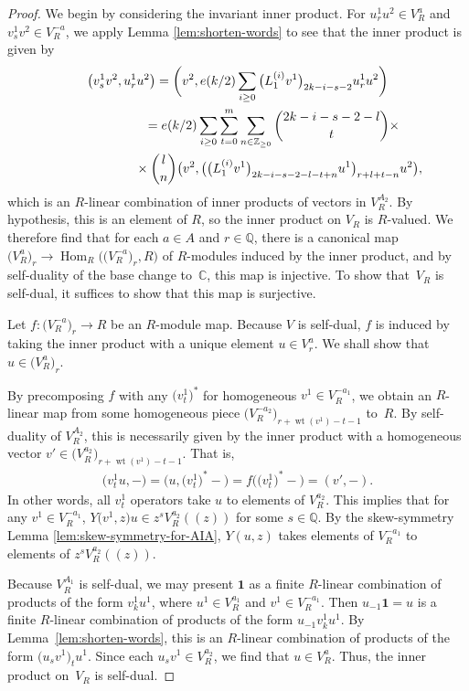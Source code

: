 \documentclass[pdftex]{sigma}
\newcommand{\bC}{\mathbb{C}}
\newcommand{\bQ}{\mathbb{Q}}
\newcommand{\bZ}{\mathbb{Z}}
\newcommand{\unit}{\mathbf{1}}
\DeclareMathOperator{\Hom}{Hom}
\DeclareMathOperator{\wt}{wt}
\theoremstyle{definition}
\begin{document}
\begin{proof}
We begin by considering the invariant inner product. For $u^1_r u^2 \in V^a_R$ and $v^1_s v^2 \in V^{-a}_R$, we apply Lemma \ref{lem:shorten-words} to see that the inner product is given by
\begin{gather*}
\big(v^1_s v^2, u^1_r u^2\big) = \bigg(v^2, e(k/2) \sum_{i \geq 0} \big(L_1^{(i)} v^1\big)_{2k-i-s-2} u^1_r u^2\bigg) \\
\hphantom{\big(v^1_s v^2, u^1_r u^2\big)}{} = e(k/2) \sum_{i \geq 0} \sum_{t=0}^m \sum_{n \in \bZ_{\geq 0}} \binom{2k-i-s-2-l}{t} \times \\
\hphantom{\big(v^1_s v^2, u^1_r u^2\big)=}{} \times \binom{l}{n} \big(v^2, \big(\big(L_1^{(i)} v^1\big)_{2k-i-s-2-l-t+n}u^1\big)_{r+l+t-n} u^2\big),
\end{gather*}
which is an $R$-linear combination of inner products of vectors in $V^{A_2}_R$. By hypothesis, this is an element of $R$, so the inner product on $V_R$ is $R$-valued. We therefore find that for each $a \in A$ and $r \in \bQ$, there is a canonical map $\big(V^a_R\big)_r \to \Hom_R\big(\big(V^{-a}_R\big)_r, R\big)$ of $R$-modules induced by the inner product, and by self-duality of the base change to~$\bC$, this map is injective. To show that~$V_R$ is self-dual, it suffices to show that this map is surjective.

Let $f\colon \big(V^{-a}_R\big)_r \to R$ be an $R$-module map. Because $V$ is self-dual, $f$ is induced by taking the inner product with a unique element $u \in V^a_r$. We shall show that $u \in \big(V^a_R\big)_r$.

By precomposing $f$ with any $\big(v^1_t\big)^*$ for homogeneous $v^1 \in V^{-a_1}_R$, we obtain an $R$-linear map from some homogeneous piece $\big(V^{-a_2}_R\big)_{r+\wt(v^1)-t-1}$ to~$R$. By self-duality of $V^{A_2}_R$, this is necessarily given by the inner product with a homogeneous vector $v' \in \big(V^{a_2}_R\big)_{r+\wt(v^1)-t-1}$. That is,
\begin{gather*} \big(v^1_t u, -\big) = \big(u, \big(v^1_t\big)^* -\big) = f\big(\big(v^1_t\big)^* -\big) = (v',-). \end{gather*}
In other words, all $v^1_t$ operators take $u$ to elements of $V^{a_2}_R$. This implies that for any $v^1 \in V^{-a_1}_R$, $Y\big(v^1,z\big)u \in z^s V^{a_2}_R((z))$ for some $s \in \bQ$. By the skew-symmetry Lemma \ref{lem:skew-symmetry-for-AIA}, $Y(u,z)$ takes elements of $V^{-a_1}_R$ to elements of $z^sV^{a_2}_R((z))$.

Because $V^{A_1}_R$ is self-dual, we may present $\unit$ as a finite $R$-linear combination of products of the form $v^1_k u^1$, where $u^1 \in V^{a_1}_R$ and $v^1 \in V^{-a_1}_R$. Then $u_{-1} \unit = u$ is a finite $R$-linear combination of products of the form $u_{-1} v^1_k u^1$. By Lemma~\ref{lem:shorten-words}, this is an $R$-linear combination of products of the form $\big(u_s v^1\big)_t u^1$. Since each $u_s v^1 \in V^{a_2}_R$, we find that $u \in V^a_R$. Thus, the inner product on~$V_R$ is self-dual.


\end{proof}
\end{document}
